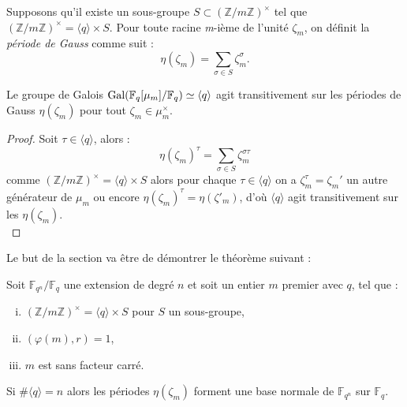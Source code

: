 \documentclass[a4paper]{article} %
\numberwithin{section}{part}
\numberwithin{equation}{section}
\newcommand\nroot[1]{\textit{#1}-ième}
\newcommand\zmodninv[1]{(\mathbb{Z}/#1\mathbb{Z})^{\times}}
\newcommand\GF[1]{\mathbb{F}_{#1}}
\newcommand\etmath{\textup{\quad et \quad}}
\newcommand\groupgen[1]{\langle{#1}\rangle}
\begin{document}
\iffalse
\begin{equation}
\#G/\groupgen{q}=g\etmath\#\groupgen{q} = f = [K[\mu_m]:K]/g.
\end{equation}
\fi

\begin{defn}
Supposons qu'il existe un sous-groupe $S\subset\zmodninv{m}$ tel que
$\zmodninv{m} = \groupgen{q}\times S$. Pour toute racine \nroot{m} de
l'unité $\zeta_m$, on définit la \emph{période de Gauss} comme suit :
\begin{equation}
\eta(\zeta_m) = \sum_{\sigma\in S}{\zeta_m^{\sigma}}.
\end{equation}
\end{defn}
\begin{prop}
\label{prop:gaussperconj}
Le groupe de Galois $\textup{Gal}(\GF{q}[\mu_m]/\GF{q})\simeq\groupgen{q}$
agit transitivement sur les périodes de Gauss $\eta(\zeta_m)$ pour tout
$\zeta_m\in\mu_m^{\times}$.
\end{prop}
\begin{proof}
Soit $\tau\in\groupgen{q}$, alors :
\begin{equation}
\eta(\zeta_m)^{\tau} = \sum_{\sigma\in S}{\zeta_m^{\sigma\tau}}
\end{equation}
comme $\zmodninv{m} = \groupgen{q}\times S$ alors pour chaque
$\tau\in\groupgen{q}$ on a $\zeta_m^{\tau} = \zeta_m'$ un autre générateur
de $\mu_m$ ou encore $\eta(\zeta_m)^{\tau} = \eta(\zeta'_m)$, d'où
$\groupgen{q}$ agit transitivement sur les $\eta(\zeta_m)$.\\
\end{proof}
Le but de la section va être de démontrer le théorème suivant :

\begin{thm}
\label{th:gausspernorm}
Soit $\GF{q^n}/\GF{q}$ une extension de degré $n$ et soit un entier $m$ premier 
avec $q$, tel que :
\vspace{0.3cm}
\begin{enumerate}[(i)]
    \item $\zmodninv{m} = \groupgen{q}\times S$ pour $S$ un sous-groupe,
    \item $(\varphi(m), r) = 1$,
    \item $m$ est sans facteur carré.
\end{enumerate}
\vspace{0.3cm}
Si $\#\groupgen{q} = n$ alors les périodes $\eta(\zeta_m)$ forment une base
normale de $\GF{q^n}$ sur $\GF{q}$.
\end{thm}
\end{document}

